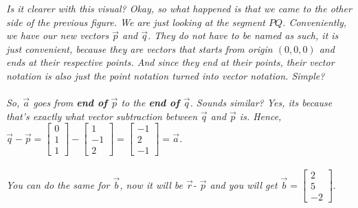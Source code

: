 \documentclass[addpoints]{exam}
\begin{document}
\pagebreak\textit{
Is it clearer with this visual? Okay, so what happened is that we came to the other side of the previous figure. We are just looking at the segment $PQ$. Conveniently, we have our new vectors $\vec{p}$ and $\vec{q}$. They do not have to be named as such, it is just convenient, because they are vectors that starts from origin $(0,0,0)$ and ends at their respective points. And since they end at their points, their vector notation is also just the point notation turned into vector notation. Simple?\\\\
}
\textit{So, $\vec{a}$ goes from \textbf{end of $\vec{p}$} to the \textbf{end of $\vec{q}$}. Sounds similar? Yes, its because that's exactly what vector subtraction between $\vec{q}$ and $\vec{p}$ is. Hence, $\vec{q}-\vec{p}=\begin{bmatrix}
    0\\1\\1
\end{bmatrix}-\begin{bmatrix}
    1\\-1\\2
\end{bmatrix}=\begin{bmatrix}
    -1\\2\\-1
\end{bmatrix}=\vec{a}$.
\\\\
You can do the same for $\vec{b}$, now it will be $\vec{r}$- $\vec{p}$ and you will get $\vec{b}=\begin{bmatrix}
    2\\5\\-2
\end{bmatrix}.$
\\\\}
\end{document}
